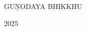 \begin{titlepage}
	{\scshape\Large 
        GUṆODAYA BHIKKHU
    } %
	
	\vspace{0.5\baselineskip} %
	
	
	\vfill %
	
	
	\plogo %
	
	\vspace{0.3\baselineskip} %
	
	2025 %
	

\end{titlepage}

%

